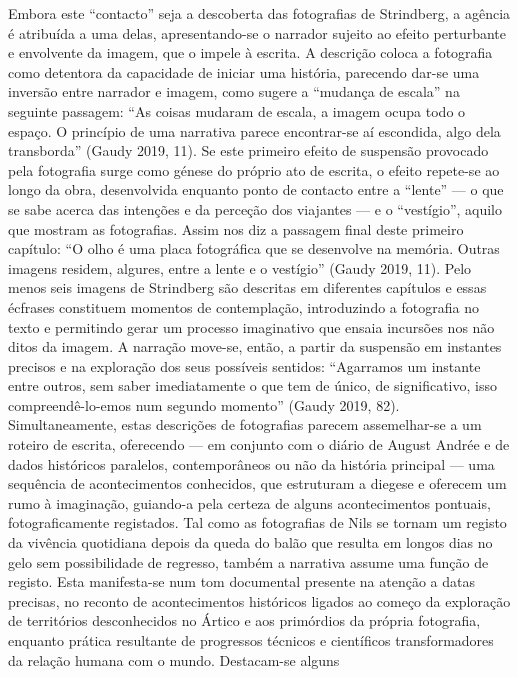 \documentclass{article}
\begin{document}
Embora este “contacto” seja a descoberta das fotografias de Strindberg, a agência é
atribuída a uma delas, apresentando-se o narrador sujeito ao efeito perturbante e
envolvente da imagem, que o impele à escrita. A descrição coloca a fotografia como
detentora da capacidade de iniciar uma história, parecendo dar-se uma inversão entre narrador e imagem, como sugere a “mudança de escala” na seguinte passagem:
“As coisas mudaram de escala, a imagem ocupa todo o espaço. O princípio de uma
narrativa parece encontrar-se aí escondida, algo dela transborda” (Gaudy 2019, 11).
Se este primeiro efeito de suspensão provocado pela fotografia surge como génese do
próprio ato de escrita, o efeito repete-se ao longo da obra, desenvolvida enquanto
ponto de contacto entre a “lente” — o que se sabe acerca das intenções e da perceção
dos viajantes — e o “vestígio”, aquilo que mostram as fotografias. Assim nos diz a
passagem final deste primeiro capítulo: “O olho é uma placa fotográfica que se desenvolve na memória. Outras imagens residem, algures, entre a lente e o vestígio”
(Gaudy 2019, 11). Pelo menos seis imagens de Strindberg são descritas em diferentes
capítulos e essas écfrases constituem momentos de contemplação, introduzindo a fotografia no texto e permitindo gerar um processo imaginativo que ensaia incursões
nos não ditos da imagem. A narração move-se, então, a partir da suspensão em instantes precisos e na exploração dos seus possíveis sentidos: “Agarramos um instante
entre outros, sem saber imediatamente o que tem de único, de significativo, isso compreendê-lo-emos num segundo momento” (Gaudy 2019, 82). Simultaneamente, estas
descrições de fotografias parecem assemelhar-se a um roteiro de escrita, oferecendo
— em conjunto com o diário de August Andrée e de dados históricos paralelos, contemporâneos ou não da história principal — uma sequência de acontecimentos conhecidos, que estruturam a diegese e oferecem um rumo à imaginação, guiando-a
pela certeza de alguns acontecimentos pontuais, fotograficamente registados. Tal
como as fotografias de Nils se tornam um registo da vivência quotidiana depois da
queda do balão que resulta em longos dias no gelo sem possibilidade de regresso,
também a narrativa assume uma função de registo. Esta manifesta-se num tom documental presente na atenção a datas precisas, no reconto de acontecimentos históricos ligados ao começo da exploração de territórios desconhecidos no Ártico e aos
primórdios da própria fotografia, enquanto prática resultante de progressos técnicos
e científicos transformadores da relação humana com o mundo. Destacam-se alguns
\end{document}
